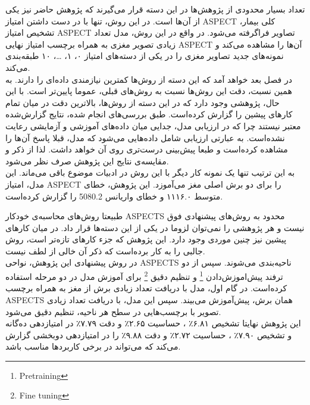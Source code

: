 تعداد بسیار محدودی از پژوهش‌ها در این دسته قرار می‌گیرند
که پژوهش حاضر نیز یکی از آن‌ها است.
در این روش، تنها با در دست داشتن امتیاز ASPECT کلی بیمار، تشخیص امتیاز ASPECT تصاویر فراگرفته می‌شود.
در واقع در این روش، مدل تعداد زیادی تصویر مغزی به همراه برچسب امتیاز نهایی ASPECT آن‌ها را مشاهده می‌کند و 
نمونه‌های جدید تصاویر مغزی را در یکی از دسته‌های امتیاز
۰، ۱، \dots، ۱۰
طبقه‌بندی می‌کند.\\

در فصل بعد خواهد آمد که این دسته از روش‌ها کمترین نیاز‌مندی داده‌ای را دارند.
به همین نسبت، دقت این روش‌ها نسبت به روش‌های قبلی، عموما پایین‌تر است.
با این حال، پژوهشی
وجود دارد که در این دسته از روش‌ها، بالاترین دقت 
در میان تمام کارهای پیشین
را گزارش کرده‌است.
طبق بررسی‌های انجام شده، نتایج گزارش‌شده معتبر نیستند
چرا که در ارزیابی مدل، جدایی میان داده‌های آموزشی و آزمایشی رعایت نشده‌است.
به عبارتی ارزیابی شامل داده‌هایی می‌شود که مدل، قبلا پاسخ آن‌ها را مشاهده کرده‌است و طبعا پیش‌بینی درست‌تری روی آن خواهد داشت.
لذا از ذکر و مقایسه‌ی نتایج این پژوهش صرف نظر می‌شود.\\

به این ترتیب تنها یک نمونه کار دیگر با این روش در ادبیات موضوع باقی می‌ماند.
این مدل، امتیاز ASPECT را برای دو برش اصلی مغز می‌آموزد.
این پژوهش، خطای متوسط ۱۱۱۶.۰ و خطای واریانس 5080.2 را گزارش کرده‌است.

طبیعتا روش‌های محاسبه‌ی خودکار ASPECTS محدود به روش‌های پیشنهادی فوق نیست
و هر پژوهشی را نمی‌توان لزوما در یکی از این دسته‌ها قرار داد.
در میان کارهای پیشین نیز چنین موردی وجود دارد.
این پژوهش که جزء کار‌های تازه‌تر است، روش جالبی را به کار برده‌است که ذکر آن خالی از لطف نیست.\\

در روش پیشنهادی این پژوهش، نواحی ASPECTS ناحیه‌بندی می‌شوند.
سپس از دو ترفند پیش‌اموزش‌دادن 
\footnote{Pretraining}
و 
تنظیم دقیق 
\footnote{Fine tuning}
برای آموزش مدل در دو مرحله استفاده کرده‌است.
در گام اول، مدل با دریافت تعداد زیادی برش از مغز به همراه برچسب ASPECTS همان برش، پیش‌آموزش می‌بیند.
سپس این مدل، با دریافت تعداد زیادی تصویر با برچسب‌هایی در سطح هر ناحیه، تنظیم دقیق می‌شود.\\

این پژوهش نهایتا تشخیص
۶.۸۱٪
،
حساسیت
۲.۶۵٪
و دقت 
۷.۷۹٪
در امتیازدهی ده‌گانه و 
تشخیص
۷.۹۰٪
،
حساسیت
۲.۷۲٪
و دقت 
۹.۸۸٪
را
در امتیازدهی دوبخشی 
گزارش می‌کند که می‌تواند در برخی کاربرد‌ها مناسب باشد.
